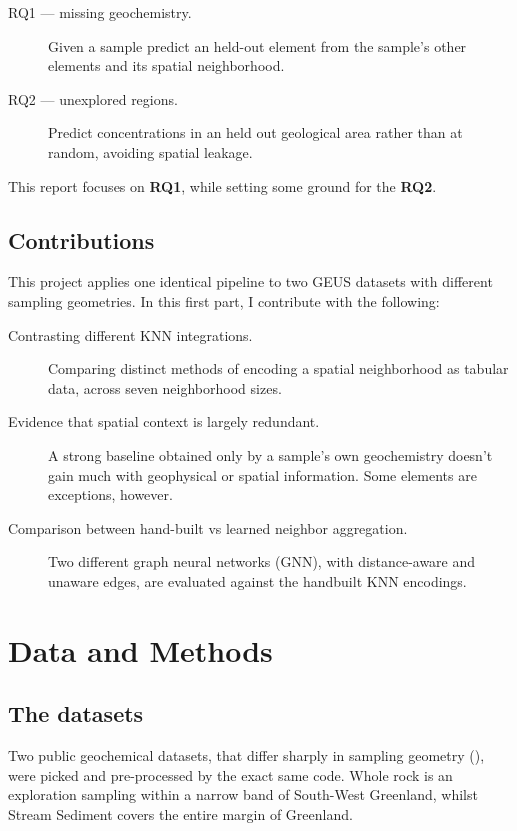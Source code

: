 \documentclass[
    a4paper,
    11pt,
    oneside,
    numbers=noendperiod,
    abstract=true
]{scrartcl}
\begin{document}
\begin{description}
    \item[RQ1 --- missing geochemistry.] Given a sample predict an held-out element from the sample's other elements and its spatial neighborhood.
    
    \item[RQ2 --- unexplored regions.] Predict concentrations in an held out geological area rather than at random, avoiding spatial leakage.
\end{description}

This report focuses on \textbf{RQ1}, while setting some ground for the \textbf{RQ2}.

\subsection{Contributions}

This project applies one identical pipeline to two GEUS datasets with different sampling geometries. In this first part, I contribute with the following: 

\begin{description}
    \item [Contrasting different KNN integrations.] Comparing distinct methods of encoding a spatial neighborhood as tabular data, across seven neighborhood sizes.
    \item [Evidence that spatial context is largely redundant.] A strong baseline obtained only by a sample's own geochemistry doesn't gain much with geophysical or spatial information. Some elements are exceptions, however.
    \item [Comparison between hand-built vs learned neighbor aggregation.] Two different graph neural networks (GNN), with distance-aware and unaware edges, are evaluated against the handbuilt KNN encodings.
    
\end{description}

\section{Data and Methods}
\label{ch:method}

\subsection{The datasets}
\label{sec:datasets}

Two public geochemical datasets, that differ sharply in sampling geometry (), were picked and pre-processed by the exact same code. 
Whole rock is an exploration sampling within a narrow band of South-West Greenland, whilst Stream Sediment covers the entire margin of Greenland.
\end{document}
